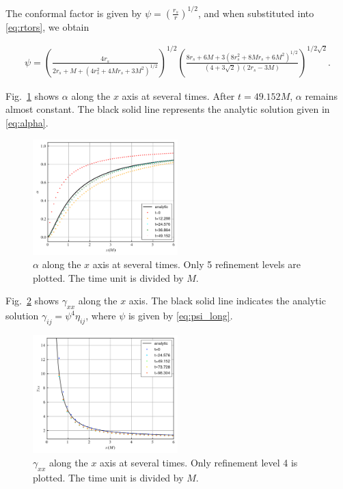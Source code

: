 \documentclass[%
 reprint,
 amsmath,amssymb,
 aps,
 prd,
]{revtex4-2}
\begin{document}
The conformal factor is given by $\psi = \left(\frac{r_s}{r}\right)^{1/2}$, and when substituted into \eqref{eq:rtors}, we obtain
\begin{widetext}
	\begin{eqnarray}
		\label{eq:psi_long}
		\psi = \left(\frac{4r_s}{2r_s + M + (4r_s^2 + 4Mr_s + 3M^2)^{1/2}}\right)^{1/2}\left(\frac{8r_s + 6M + 3 (8r_s^2 + 8Mr_s + 6M^2)^{1/2}}{(4+3\sqrt{2})(2r_s - 3M)}\right)^{1/2\sqrt{2}}.
	\end{eqnarray}
\end{widetext}

Fig.~\ref{fig:alphas} shows $\alpha$ along the $x$ axis at several times. After $t=49.152M$, $\alpha$ remains almost constant. The black solid line represents the analytic solution given in \eqref{eq:alpha}.
\begin{figure}[h]
	\includegraphics[width=0.5\textwidth]{data/alphas.png}%
	\caption{\label{fig:alphas} $\alpha$ along the $x$ axis at several times. Only 5 refinement levels are plotted. The time unit is divided by $M$.}
\end{figure}

Fig.~\ref{fig:ev_gammaxx} shows $\gamma_{xx}$ along the $x$ axis. The black solid line indicates the analytic solution $\gamma_{ij} = \psi^4 \eta_{ij}$, where $\psi$ is given by \eqref{eq:psi_long}.

\begin{figure}[h]
	\includegraphics[width=0.5\textwidth]{data/ev_gammaxx.png}%
	\caption{\label{fig:ev_gammaxx} $\gamma_{xx}$ along the $x$ axis at several times. Only refinement level 4 is plotted. The time unit is divided by $M$.}
\end{figure}
\end{document}
